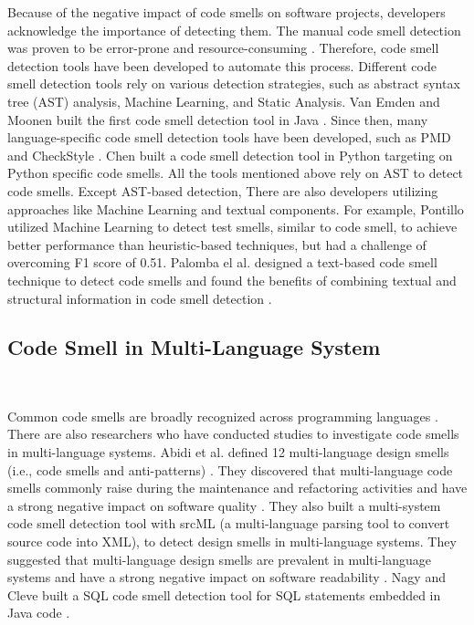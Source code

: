 Because of the negative impact of code smells on software projects, developers
acknowledge the importance of detecting them. The manual code smell detection
was proven to be error-prone and resource-consuming
\cite{DetectingDefectsInObject}. Therefore, code smell detection tools have been
developed to automate this process. Different code smell detection tools rely on
various detection strategies, such as abstract syntax tree (AST) analysis,
Machine Learning, and Static Analysis. Van Emden and Moonen built the first code
smell detection tool in Java \cite{1173068}. Since then, many language-specific
code smell detection tools have been developed, such as PMD \cite{PMD} and
CheckStyle \cite{CheckStyle}. Chen \cite{Pysmell} built a code smell detection
tool in Python targeting on Python specific code smells. All the tools mentioned
above rely on AST to detect code smells. Except AST-based detection, There are
also developers utilizing approaches like Machine Learning and textual
components. For example, Pontillo utilized Machine Learning to detect test
smells, similar to code smell, to achieve better performance than
heuristic-based techniques, but had a challenge of overcoming F1 score of 0.51.
Palomba el al. designed a text-based code smell technique to detect code smells
and found the benefits of combining textual and structural information in code
smell detection \cite{Palomba}.

\subsection{Code Smell in Multi-Language System}~\label{sec: Code Smell in
Multi-Language System}

Common code smells are broadly recognized across programming languages
\cite{PMD,CheckStyle,Pysmell,Jscent,DesigniteJava}. There are also researchers
who have conducted studies to investigate code smells in multi-language systems.
Abidi et al. defined 12 multi-language design smells (i.e., code smells and
anti-patterns) \cite{MultiLanguageCodeSmells}. They discovered that
multi-language code smells commonly raise during the maintenance and refactoring
activities and have a strong negative impact on software quality \cite{Abidi2}.
They also built a multi-system code smell detection tool with srcML (a
multi-language parsing tool to convert source code into XML), to detect design
smells in multi-language systems. They suggested that multi-language design
smells are prevalent in multi-language systems and have a strong negative impact
on software readability \cite{Fault-Prone}. Nagy and Cleve built a SQL code
smell detection tool for SQL statements embedded in Java code \cite{SQLInJava}.
